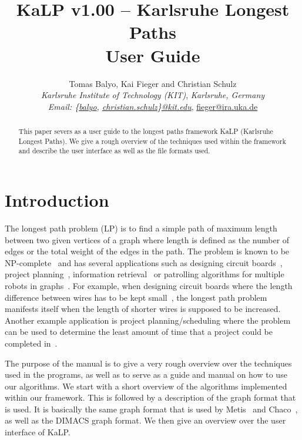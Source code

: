 \documentclass[11pt]{article}
\newcommand{\mytitle}{ {\color{red}KaLP} v1.00 -- {\color{red}Ka}rlsruhe {\color{red}L}ongest {\color{red}P}aths \\ User Guide}
\begin{document}
\title{\mytitle}
\author{Tomas Balyo, Kai Fieger and Christian Schulz\\ 
	\textit{Karlsruhe Institute of Technology (KIT)},
	\textit{Karlsruhe, Germany} \\
	\textit{Email: \{\url{balyo}, \url{christian.schulz}\}\url{@kit.edu}}, \url{fieger@ira.uka.de} }
\date{}

\maketitle
\begin{abstract}
This paper severs as a user guide to the longest paths framework KaLP (Karlsruhe Longest Paths). We give a rough overview of the techniques used within the framework and describe the user interface as well as the file formats used. 
\end{abstract}

\tableofcontents
\thispagestyle{empty}

\vfill
\pagebreak
\section{Introduction}
The longest path problem (LP) is to find a simple path 
of maximum length between two given vertices of a graph 
where length is defined as the number of edges or the total weight of the edges in the path.
The problem is known to be NP-complete~\cite{NP} and has several applications such as designing circuit boards~\cite{Circuit1,Circuit2}, project planning~\cite{Brucker}, information retrieval~\cite{Wong} or patrolling algorithms for multiple robots in graphs~\cite{Multirobot}. 
For example, when designing circuit boards where the length difference between wires has to be 
kept small~\cite{Circuit1,Circuit2}, the longest path problem manifests itself when the length of shorter wires is supposed to be increased. 
Another example application is project planning/scheduling where the problem can be used to determine the least 
amount of time that a project could be completed in~\cite{Brucker}. 

The purpose of the manual is to give a very rough overview over the techniques used in the programs, as well as to serve as a guide and manual on how to use our algorithms. 
We start with a short overview of the algorithms implemented within our framework. 
This is followed by a description of the graph format that is used. 
It is basically the same graph format that is used by Metis~\cite{karypis1998fast} and Chaco~\cite{chaco}, as well as the DIMACS graph format. We then give an overview over the user interface of KaLP.
\vfill
\pagebreak
\end{document}
